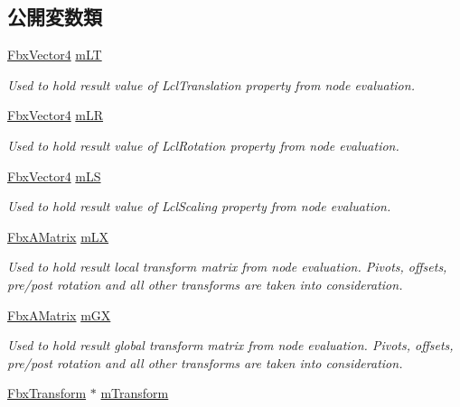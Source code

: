 \subsection*{公開変数類}
\begin{DoxyCompactItemize}
\item 
\hyperlink{class_fbx_vector4}{Fbx\+Vector4} \hyperlink{class_fbx_node_eval_state_a06f62c625cb7095d6334a21ba5cde42d}{m\+LT}
\begin{DoxyCompactList}\small\item\em Used to hold result value of Lcl\+Translation property from node evaluation. \end{DoxyCompactList}\item 
\hyperlink{class_fbx_vector4}{Fbx\+Vector4} \hyperlink{class_fbx_node_eval_state_ac630f31b0915572e2a4e248b20c3b447}{m\+LR}
\begin{DoxyCompactList}\small\item\em Used to hold result value of Lcl\+Rotation property from node evaluation. \end{DoxyCompactList}\item 
\hyperlink{class_fbx_vector4}{Fbx\+Vector4} \hyperlink{class_fbx_node_eval_state_a6e1f5d4bf262b03068164d7d0e3641bd}{m\+LS}
\begin{DoxyCompactList}\small\item\em Used to hold result value of Lcl\+Scaling property from node evaluation. \end{DoxyCompactList}\item 
\hyperlink{class_fbx_a_matrix}{Fbx\+A\+Matrix} \hyperlink{class_fbx_node_eval_state_a54312754ca26de28be9272c304e7ba4f}{m\+LX}
\begin{DoxyCompactList}\small\item\em Used to hold result local transform matrix from node evaluation. Pivots, offsets, pre/post rotation and all other transforms are taken into consideration. \end{DoxyCompactList}\item 
\hyperlink{class_fbx_a_matrix}{Fbx\+A\+Matrix} \hyperlink{class_fbx_node_eval_state_a28e9c56c4abd928db69ea10e46656994}{m\+GX}
\begin{DoxyCompactList}\small\item\em Used to hold result global transform matrix from node evaluation. Pivots, offsets, pre/post rotation and all other transforms are taken into consideration. \end{DoxyCompactList}\item 
\hyperlink{class_fbx_transform}{Fbx\+Transform} $\ast$ \hyperlink{class_fbx_node_eval_state_a49ac9e098c85b1642bb7f78d90c756ac}{m\+Transform}
\end{DoxyCompactItemize}


